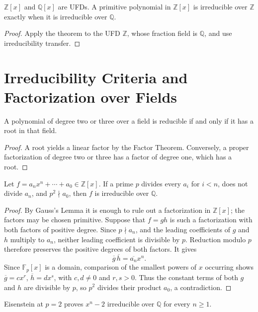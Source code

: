 \begin{corollary}
\(\mathbb Z[x]\) and \(\mathbb Q[x]\) are UFDs.  A primitive polynomial in
\(\mathbb Z[x]\) is irreducible over \(\mathbb Z\) exactly when it is
irreducible over \(\mathbb Q\).
\end{corollary}
\begin{proof}
Apply the theorem to the UFD \(\mathbb Z\), whose fraction field is
\(\mathbb Q\), and use irreducibility transfer.
\end{proof}

\section{Irreducibility Criteria and Factorization over Fields}
\begin{proposition}
A polynomial of degree two or three over a field is reducible if and only if
it has a root in that field.
\end{proposition}
\begin{proof} A root yields a linear factor by the Factor Theorem.  Conversely,
a proper factorization of degree two or three has a factor of degree one,
which has a root. \end{proof}
\begin{theorem}
Let \(f=a_nx^n+\cdots+a_0\in\mathbb Z[x]\).  If a prime \(p\) divides every
\(a_i\) for \(i<n\), does not divide \(a_n\), and \(p^2\nmid a_0\), then
\(f\) is irreducible over \(\mathbb Q\).
\end{theorem}
\begin{proof} By Gauss's Lemma it is enough to rule out a factorization in
\(\mathbb Z[x]\); the factors may be chosen primitive.  Suppose that
\(f=gh\) is such a factorization with both factors of positive degree.  Since
\(p\nmid a_n\), and the leading coefficients of \(g\) and \(h\) multiply to
\(a_n\), neither leading coefficient is divisible by \(p\).  Reduction modulo
\(p\) therefore preserves the positive degrees of both factors.  It gives
\[\overline g\,\overline h=\overline {a_n}x^n.\]
Since \(\mathbb F_p[x]\) is a domain, comparison of the smallest powers of
\(x\) occurring shows
\(\overline g=cx^r\), \(\overline h=dx^s\), with \(c,d\ne0\) and
\(r,s>0\).  Thus the constant terms of both \(g\) and \(h\) are divisible by
\(p\), so \(p^2\) divides their product \(a_0\), a contradiction.
\end{proof}
\begin{example} Eisenstein at \(p=2\) proves \(x^n-2\) irreducible over
\(\mathbb Q\) for every \(n\ge1\). \end{example}


